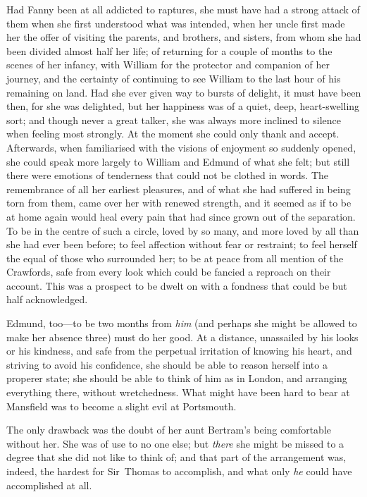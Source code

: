 Had Fanny been at all addicted to raptures, she must have had a strong attack of them when she first understood what was intended, when her uncle first made her the offer of visiting the parents, and brothers, and sisters, from whom she had been divided almost half her life; of returning for a couple of months to the scenes of her infancy, with William for the protector and companion of her journey, and the certainty of continuing to see William to the last hour of his remaining on land. Had she ever given way to bursts of delight, it must have been then, for she was delighted, but her happiness was of a quiet, deep, heart-swelling sort; and though never a great talker, she was always more inclined to silence when feeling most strongly. At the moment she could only thank and accept. Afterwards, when familiarised with the visions of enjoyment so suddenly opened, she could speak more largely to William and Edmund of what she felt; but still there were emotions of tenderness that could not be clothed in words. The remembrance of all her earliest pleasures, and of what she had suffered in being torn from them, came over her with renewed strength, and it seemed as if to be at home again would heal every pain that had since grown out of the separation. To be in the centre of such a circle, loved by so many, and more loved by all than she had ever been before; to feel affection without fear or restraint; to feel herself the equal of those who surrounded her; to be at peace from all mention of the Crawfords, safe from every look which could be fancied a reproach on their account. This was a prospect to be dwelt on with a fondness that could be but half acknowledged.

Edmund, too—to be two months from \textit{him}  (and perhaps she might be allowed to make her absence three) must do her good. At a distance, unassailed by his looks or his kindness, and safe from the perpetual irritation of knowing his heart, and striving to avoid his confidence, she should be able to reason herself into a properer state; she should be able to think of him as in London, and arranging everything there, without wretchedness. What might have been hard to bear at Mansfield was to become a slight evil at Portsmouth.

The only drawback was the doubt of her aunt Bertram's being comfortable without her. She was of use to no one else; but \textit{there}  she might be missed to a degree that she did not like to think of; and that part of the arrangement was, indeed, the hardest for Sir~Thomas to accomplish, and what only \textit{he}  could have accomplished at all.

